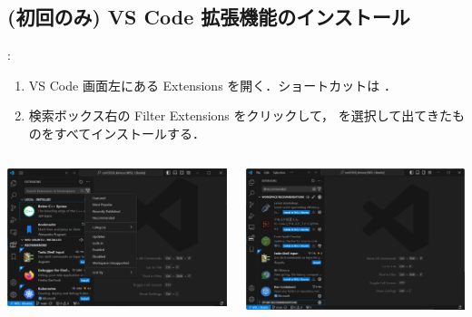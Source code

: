 \documentclass[aspectratio=169,dvipdfmx,cjk]{beamer}
\begin{document}
\subsection{(初回のみ) VS Code 拡張機能のインストール}
\begin{frame}{\insertsection \thesubsection: \insertsubsection}
  \begin{enumerate}
    \item VS Code 画面左にある Extensions を開く．ショートカットは ．
    \item 検索ボックス右の Filter Extensions をクリックして， を選択して出てきたものをすべてインストールする．
  \end{enumerate}
  \begin{columns}
    \begin{column}{0.45\textwidth}
        \includegraphics[width=1.0\linewidth]{fig/vscode-extentions.png}
    \end{column}
    \begin{column}{0.45\textwidth}
      \includegraphics[width=1.0\linewidth]{fig/vscode-recommneded.png}
    \end{column}
  \end{columns}
\end{frame}
\end{document}
